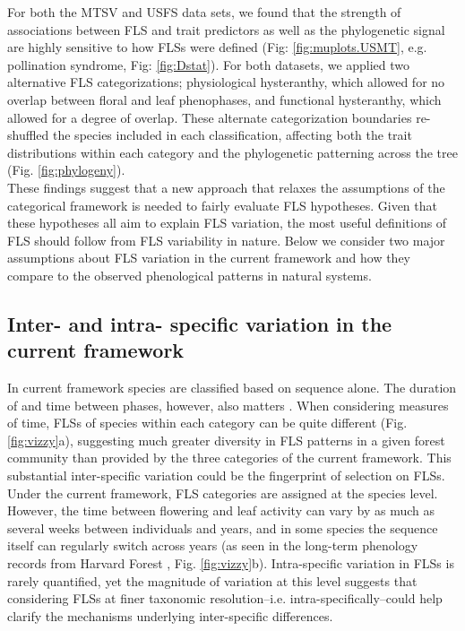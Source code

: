 \documentclass[12pt]{article}
\begin{document}
\noindent For both the MTSV and USFS data sets, we found that the strength of associations between FLS and trait predictors as well as the phylogenetic signal are highly sensitive to how FLSs were defined (Fig: \ref{fig:muplots.USMT}, e.g. pollination syndrome, Fig: \ref{fig:Dstat}). For both datasets, we applied two alternative FLS categorizations; physiological hysteranthy, which allowed for no overlap between floral and leaf phenophases, and functional hysteranthy, which allowed for a degree of overlap. These alternate categorization boundaries re-shuffled the species included in each classification, affecting both the trait distributions within each category and the phylogenetic patterning across the tree (Fig. \ref{fig:phylogeny}).\\ 
 
\noindent These findings suggest that a new approach that relaxes the assumptions of the categorical framework is needed to fairly evaluate FLS hypotheses. Given that these hypotheses all aim to explain FLS variation, the most useful definitions of FLS should follow from FLS variability in nature. Below we consider two major assumptions about FLS variation in the current framework and how they compare to the observed phenological patterns in natural systems.\\

\subsection*{Inter- and intra- specific variation in the current framework}
\noindent In current framework species are classified based on sequence alone. The duration of and time between phases, however, also matters \citep{Inouye2019}. When considering measures of time, FLSs of species within each category can be quite different (Fig. \ref{fig:vizzy}a), suggesting much greater diversity in FLS patterns in a given forest community than provided by the three categories of the current framework. This substantial inter-specific variation could be the fingerprint of selection on FLSs.\\ 

\noindent Under the current framework, FLS categories are assigned at the species level. However, the time between flowering and leaf activity can vary by as much as several weeks between individuals and years, and in some species the sequence itself can regularly switch across years (as seen in the long-term phenology records from  Harvard Forest \citep{OKeefe2015}, Fig. \ref{fig:vizzy}b). Intra-specific variation in FLSs is rarely quantified, yet the magnitude of variation at this level suggests that considering FLSs at finer taxonomic resolution--i.e. intra-specifically--could help clarify the mechanisms underlying inter-specific differences.\\
\end{document}
